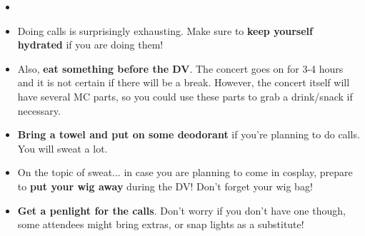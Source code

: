 \ifdefined\COMPLETE
\else
	
	
\fi

\def\pagetitletext{Before The Live...}
{\large
\begin{changemargin}{1em}{3em}
\begin{itemize}
~\vspace{\fill}\\
\item{}
\item{Doing calls is surprisingly exhausting. Make sure to \textbf{keep yourself hydrated} if you are doing them!}
\vspace*{\fill}\\
\item{Also, \textbf{eat something before the DV}. The concert goes on for 3-4 hours and it is not certain if there will be a break. However, the concert itself will have several MC parts, so you could use these parts to grab a drink/snack if necessary.}
\vspace*{\fill}\\
\item{\textbf{Bring a towel and put on some deodorant} if you’re planning to do calls. You will sweat a lot.}
\vspace*{\fill}\\
\item{On the topic of sweat... in case you are planning to come in cosplay, prepare to \textbf{put your wig away} during the DV! Don't forget your wig bag!}
\vspace*{\fill}\\
\item{\textbf{Get a penlight for the calls}. Don’t worry if you don’t have one though, some attendees might bring extras, or snap lights as a substitute!}
\vspace*{\fill}\\
\end{itemize}
\end{changemargin}
}
\ifdefined\COMPLETE
\else
	
\fi